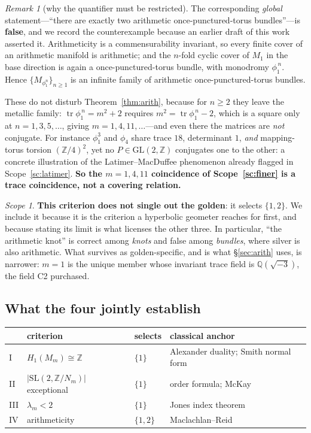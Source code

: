 \documentclass[11pt,reqno]{amsart}
\theoremstyle{plain}
\theoremstyle{definition}
\theoremstyle{remark}
\newtheorem{scope}[theorem]{Scope}
\newtheorem{remark}[theorem]{Remark}
\newcommand{\Q}{\mathbb{Q}}
\newcommand{\Z}{\mathbb{Z}}
\newcommand{\SL}{\mathrm{SL}}
\newcommand{\GL}{\mathrm{GL}}
\newcommand{\tr}{\operatorname{tr}}
\begin{document}
\begin{remark}[why the quantifier must be restricted]\label{rem:notglobal}
The corresponding \emph{global} statement---``there are exactly two arithmetic
once-punctured-torus bundles''---is \textbf{false}, and we record the counterexample
because an earlier draft of this work asserted it. Arithmeticity is a commensurability
invariant, so every finite cover of an arithmetic manifold is arithmetic; and the
$n$-fold cyclic cover of $M_1$ in the base direction is again a once-punctured-torus
bundle, with monodromy $\phi_1^{\,n}$. Hence $\{M_{\phi_1^n}\}_{n\ge1}$ is an infinite
family of arithmetic once-punctured-torus bundles.

These do not disturb Theorem~\ref{thm:arith}, because for $n\ge2$ they leave the
metallic family: $\tr\phi_1^{\,n}=m^2+2$ requires $m^2=\tr\phi_1^{\,n}-2$, which is a
square only at $n=1,3,5,\dots$, giving $m=1,4,11,\dots$---and even there the matrices
are \emph{not} conjugate. For instance $\phi_1^{3}$ and $\phi_4$ share trace $18$,
determinant $1$, \emph{and} mapping-torus torsion $(\Z/4)^2$, yet no
$P\in\GL(2,\Z)$ conjugates one to the other: a concrete illustration of the
Latimer--MacDuffee phenomenon already flagged in Scope~\ref{sc:latimer}. \textbf{So the
$m=1,4,11$ coincidence of Scope~\ref{sc:finer} is a trace coincidence, not a covering
relation.}
\end{remark}

\begin{scope}\label{sc:arithlimit}
\textbf{This criterion does not single out the golden}: it selects $\{1,2\}$. We include
it because it is the criterion a hyperbolic geometer reaches for first, and because
stating its limit is what licenses the other three. In particular, ``the arithmetic
knot'' is correct among \emph{knots} and false among \emph{bundles}, where silver is
also arithmetic. What survives as golden-specific, and is what \S\ref{sec:arith} uses,
is narrower: $m=1$ is the unique member whose invariant trace field is $\Q(\sqrt{-3})$,
the field C2 purchased.
\end{scope}

\subsection{What the four jointly establish}

\begin{table}[htbp]
\centering\small
\begin{tabular}{@{}llll@{}}
\toprule
 & criterion & selects & classical anchor\\
\midrule
I   & $H_1(M_m)\cong\Z$ & $\{1\}$ & Alexander duality; Smith normal form\\
II  & $|\SL(2,\Z/N_m)|$ exceptional & $\{1\}$ & order formula; McKay\\
III & $\lambda_m<2$ & $\{1\}$ & Jones index theorem\\
IV  & arithmeticity & $\{1,2\}$ & Maclachlan--Reid\\
\bottomrule
\end{tabular}
\end{table}
\end{document}

